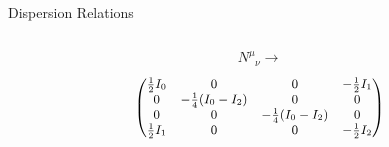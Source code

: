 \begin{frame}{Dispersion Relations}
\begin{columns}[T]
\begin{column}{0.5\textwidth}
   \begin{equation*}
      N^\mu_{\phantom{\mu}\nu} \to
   \end{equation*}
\begin{equation*}
    \small
  \begin{pmatrix}
   \frac{1}{2}  I_0 & 0 & 0 & -\frac{1}{2}I_1\\
   0 & -\frac{1}{4}(I_0-I_2) & 0 & 0\\
   0 & 0 & -\frac{1}{4}(I_0-I_2) & 0 \\
   \frac{1}{2}I_1 & 0 & 0 & -\frac{1}{2}I_2
   \end{pmatrix}
   \end{equation*}





\end{column}

\end{columns}

%

\end{frame}


